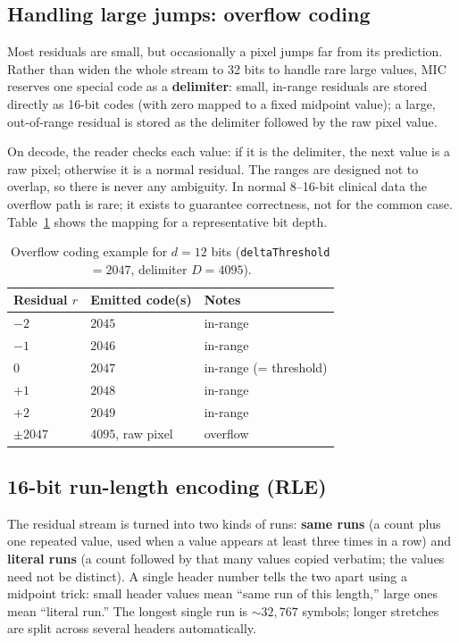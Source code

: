 \documentclass[journal]{IEEEtran}
\begin{document}
\subsection{Handling large jumps: overflow coding}

Most residuals are small, but occasionally a pixel jumps far from its
prediction. Rather than widen the whole stream to 32 bits to handle rare large
values, MIC reserves one special code as a \textbf{delimiter}: small, in-range
residuals are stored directly as 16-bit codes (with zero mapped to a fixed
midpoint value); a large, out-of-range residual is stored as the delimiter
followed by the raw pixel value.

On decode, the reader checks each value: if it is the delimiter, the next
value is a raw pixel; otherwise it is a normal residual. The ranges are
designed not to overlap, so there is never any ambiguity. In normal 8--16-bit
clinical data the overflow path is rare; it exists to guarantee correctness,
not for the common case. Table~\ref{tab:overflow-map} shows the mapping for a
representative bit depth.

\begin{table}[htbp]
\centering
\caption{Overflow coding example for $d=12$ bits
(\texttt{deltaThreshold}$=2047$, delimiter $D=4095$).}
\label{tab:overflow-map}
\scriptsize
\begin{tabular}{lll}
\toprule
Residual $r$ & Emitted code(s) & Notes \\
\midrule
$-2$ & $2045$ & in-range \\
$-1$ & $2046$ & in-range \\
$0$  & $2047$ & in-range (= threshold) \\
$+1$ & $2048$ & in-range \\
$+2$ & $2049$ & in-range \\
$\pm 2047$ & $4095$, raw pixel & overflow \\
\bottomrule
\end{tabular}
\end{table}

\subsection{16-bit run-length encoding (RLE)}

The residual stream is turned into two kinds of runs: \textbf{same runs} (a
count plus one repeated value, used when a value appears at least three times
in a row) and \textbf{literal runs} (a count followed by that many values
copied verbatim; the values need not be distinct). A single header number tells
the two apart using a midpoint trick: small header values mean ``same run of
this length,'' large ones mean ``literal run.'' The longest single run is
${\sim}32{,}767$ symbols; longer stretches are split across several headers
automatically.
\end{document}
